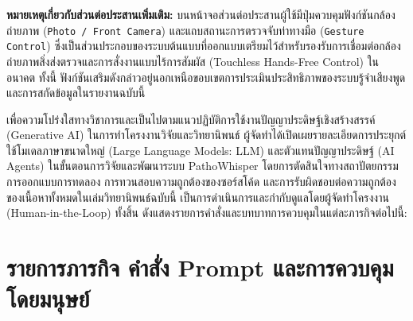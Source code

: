 \noindent \textbf{หมายเหตุเกี่ยวกับส่วนต่อประสานเพิ่มเติม:}
บนหน้าจอส่วนต่อประสานผู้ใช้มีปุ่มควบคุมฟังก์ชันกล้องถ่ายภาพ (\texttt{Photo / Front Camera}) และแถบสถานะการตรวจจับท่าทางมือ (\texttt{Gesture Control}) ซึ่งเป็นส่วนประกอบของระบบต้นแบบที่ออกแบบเตรียมไว้สำหรับรองรับการเชื่อมต่อกล้องถ่ายภาพสิ่งส่งตรวจและการสั่งงานแบบไร้การสัมผัส (Touchless Hands-Free Control) ในอนาคต ทั้งนี้ ฟังก์ชันเสริมดังกล่าวอยู่นอกเหนือขอบเขตการประเมินประสิทธิภาพของระบบรู้จำเสียงพูดและการสกัดข้อมูลในรายงานฉบับนี้

\label{app:aideclaration}

เพื่อความโปร่งใสทางวิชาการและเป็นไปตามแนวปฏิบัติการใช้งานปัญญาประดิษฐ์เชิงสร้างสรรค์ (Generative AI) ในการทำโครงงานวิจัยและวิทยานิพนธ์ ผู้จัดทำได้เปิดเผยรายละเอียดการประยุกต์ใช้โมเดลภาษาขนาดใหญ่ (Large Language Models: LLM) และตัวแทนปัญญาประดิษฐ์ (AI Agents) ในขั้นตอนการวิจัยและพัฒนาระบบ PathoWhisper โดยการตัดสินใจทางสถาปัตยกรรม การออกแบบการทดลอง การทวนสอบความถูกต้องของซอร์สโค้ด และการรับผิดชอบต่อความถูกต้องของเนื้อหาทั้งหมดในเล่มวิทยานิพนธ์ฉบับนี้ เป็นการดำเนินการและกำกับดูแลโดยผู้จัดทำโครงงาน (Human-in-the-Loop) ทั้งสิ้น ดังแสดงรายการคำสั่งและบทบาทการควบคุมในแต่ละภารกิจต่อไปนี้:

\section*{รายการภารกิจ คำสั่ง Prompt และการควบคุมโดยมนุษย์}

